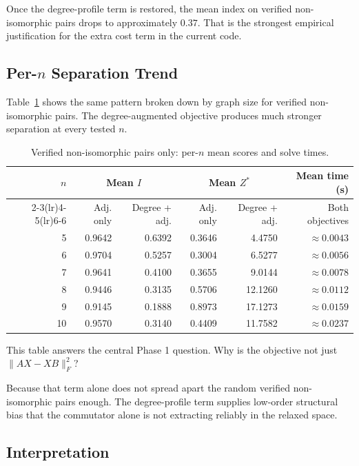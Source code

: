 \documentclass[11pt]{article}
\begin{document}
Once the degree-profile term is restored, the mean index on verified non-isomorphic pairs drops to approximately $0.37$.
That is the strongest empirical justification for the extra cost term in the current code.

\subsection{Per-$n$ Separation Trend}

Table~\ref{tab:per-n-noniso} shows the same pattern broken down by graph size for verified non-isomorphic pairs.
The degree-augmented objective produces much stronger separation at every tested $n$.

\begin{table}[h]
\centering
\caption{Verified non-isomorphic pairs only: per-$n$ mean scores and solve times.}
\label{tab:per-n-noniso}
\begin{tabular}{r r r r r r}
\toprule
$n$ & \multicolumn{2}{c}{Mean $I$} & \multicolumn{2}{c}{Mean $Z^*$} & Mean time (s) \\
\cmidrule(lr){2-3}\cmidrule(lr){4-5}\cmidrule(lr){6-6}
 & Adj. only & Degree + adj. & Adj. only & Degree + adj. & Both objectives \\
\midrule
5  & 0.9642 & 0.6392 & 0.3646 & 4.4750 & $\approx 0.0043$ \\
6  & 0.9704 & 0.5257 & 0.3004 & 6.5277 & $\approx 0.0056$ \\
7  & 0.9641 & 0.4100 & 0.3655 & 9.0144 & $\approx 0.0078$ \\
8  & 0.9446 & 0.3135 & 0.5706 & 12.1260 & $\approx 0.0112$ \\
9  & 0.9145 & 0.1888 & 0.8973 & 17.1273 & $\approx 0.0159$ \\
10 & 0.9570 & 0.3140 & 0.4409 & 11.7582 & $\approx 0.0237$ \\
\bottomrule
\end{tabular}
\end{table}

This table answers the central Phase 1 question.
Why is the objective not just $\|AX - XB\|_F^2$?

Because that term alone does not spread apart the random verified non-isomorphic pairs enough.
The degree-profile term supplies low-order structural bias that the commutator alone is not extracting reliably in the relaxed space.

\subsection{Interpretation}
\end{document}
